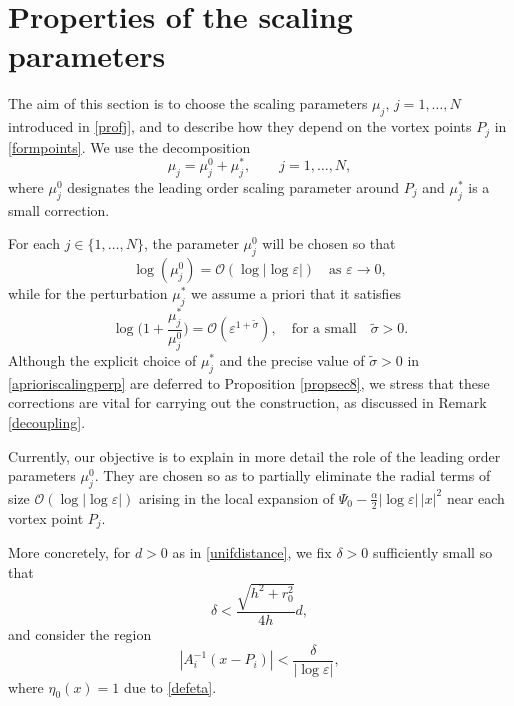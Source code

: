\documentclass[11pt,reqno,a4paper]{amsart}
\numberwithin{equation}{section}
\newcommand{\ve}{\varepsilon}
\begin{document}
\section{Properties of the scaling parameters}\label{Section 4}
The aim of this section is to choose the scaling parameters $\mu_j,\, j=1,\dots,N$ introduced in \eqref{profj}, and to describe how they depend on the vortex points $P_j$ in \eqref{formpoints}. We use the decomposition
\begin{equation}\label{scalingansatz}
\mu_j=\mu_j^{0}+\mu^{*}_j, \qquad j=1,\dots,N,
\end{equation}
where $\mu_j^{0}$ designates the leading order scaling parameter around $P_j$ and $\mu_j^{*}$ is a small correction.

For each $j\in\{1,\dots,N\}$, the parameter $\mu_j^{0}$ will be chosen so that
\[
\log(\mu^{0}_{j})=\mathcal{O}\left(\log|\log\ve|\right)\quad \text{as }\ve\to 0,
\]
while for the perturbation $\mu_j^{*}$ we assume a priori that it satisfies
\begin{equation}\label{aprioriscalingperp}
\log\bigg(1+\frac{\mu_{j}^{*}}{\mu_{j}^{0}}\bigg)
=\mathcal{O}\left(\ve^{1+\tilde{\sigma}}\right), \quad \mbox{for a small} \quad \tilde{\sigma}>0.
\end{equation}
Although the explicit choice of $\mu_j^{*}$ and the precise value of $\tilde{\sigma}>0$ in \eqref{aprioriscalingperp} are deferred to
Proposition \ref{propsec8}, we stress that these corrections are vital for carrying out the construction, as discussed in Remark \ref{decoupling}. 

Currently, our objective is to explain in more detail the role of the leading order parameters $\mu_j^{0}$. They are chosen so as to partially eliminate the radial terms of size
$\mathcal{O}(\log|\log\ve|)$ arising in the local expansion of
$\Psi_{0}-\frac{\alpha}{2}|\log\ve|\,|x|^{2}$
near each vortex point $P_j$.

More concretely, for $d>0$ as in \eqref{unifdistance}, we fix $\delta>0$ sufficiently small so that
\begin{equation}\label{cond1delta}
\delta < \frac{\sqrt{h^2+r_0^2}}{4h}d,
\end{equation}
and consider the region
\begin{equation}\label{firstdelta}
|A_{i}^{-1}\left(x-P_i\right)|< \frac{\delta}{|\log\ve|},
\end{equation}
where $\eta_{0}(x)= 1$ due to \eqref{defeta}.  
\end{document}
